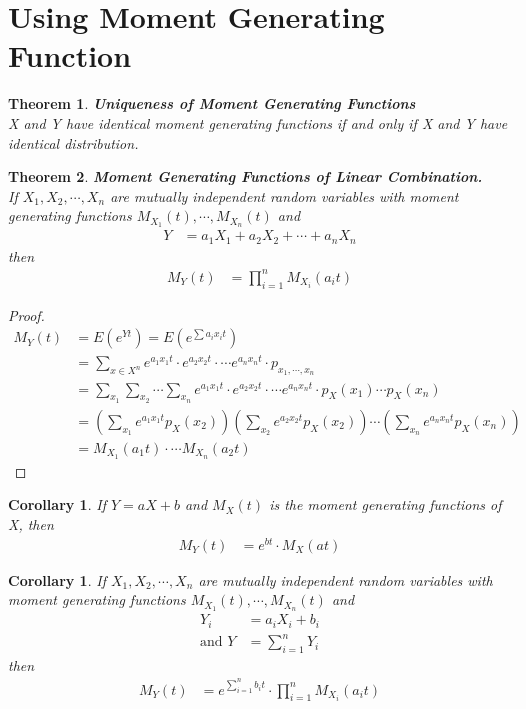 \documentclass[11pt,oneside]{book}
\theoremstyle{break}
\theoremstyle{break}
\newtheorem{thm}{Theorem}[section]
\newtheorem{corT}[lem]{Corollary}
\begin{document}
\section[Using Moment Generating Function]{\color{DarkOrchid}Using Moment Generating Function}
\begin{thm}
\textbf{Uniqueness of Moment Generating Functions}\\
X and Y have identical moment generating functions if and only if X and Y have identical distribution.
\end{thm}
\begin{thm}
\textbf{Moment Generating Functions of Linear Combination.}\\
If $X_1,X_2,\cdots,X_n$ are mutually independent random variables with moment generating functions $M_{X_1}(t),\cdots,M_{X_n}(t)$ and \begin{align*}
Y&=a_1X_1+a_2X_2+\cdots +a_nX_n
\end{align*}
then \begin{align*}
M_Y(t)&=\prod_{i=1}^{n}M_{X_i}(a_it)
\end{align*}
\end{thm}
\begin{proof}
\begin{align*}
M_Y(t)&=E(e^{Yt})=E(e^{\sum a_ix_it})\\
&=\sum_{x\in X^n}e^{a_1x_1t}\cdot e^{a_2x_2t}\cdot \cdots e^{a_nx_nt}\cdot p_{x_1,\cdots,x_n}\\
&=\sum_{x_1}\sum_{x_2}\cdots \sum_{x_n}e^{a_1x_1t}\cdot e^{a_2x_2t}\cdot \cdots e^{a_nx_nt}\cdot p_X(x_1)\cdots p_X(x_n)\\
&=\left(\sum_{x_1}e^{a_1x_1t}p_X(x_2) \right)\left(\sum_{x_2}e^{a_2x_2t}p_X(x_2)  \right)\cdots \left(\sum_{x_n}e^{a_nx_nt}p_X(x_n) \right)\\
&=M_{X_1}(a_1t)\cdot \cdots M_{X_n}(a_2t)
\end{align*}
\end{proof}
\begin{corT}
If $Y=aX+b$ and $M_X(t)$ is the moment generating functions of X, then \begin{align*}
M_Y(t)&=e^{bt}\cdot M_X(at)
\end{align*} 
\end{corT}
\begin{corT}
If $X_1,X_2,\cdots,X_n$ are mutually independent random variables with moment generating functions $M_{X_1}(t),\cdots,M_{X_n}(t)$ and \begin{align*}
Y_i&=a_iX_i+b_i\\
\text{and }Y&=\sum_{i=1}^{n}Y_i
\end{align*}
then \begin{align*}
M_Y(t)&=e^{\sum_{i=1}^nb_it}\cdot \prod_{i=1}^{n}M_{X_i}(a_it)
\end{align*}
\end{corT}
\end{document}
